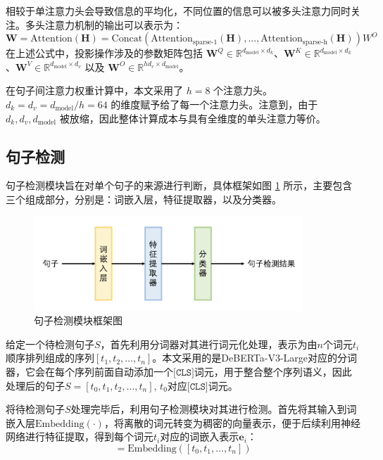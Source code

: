相较于单注意力头会导致信息的平均化，不同位置的信息可以被多头注意力同时关注。多头注意力机制的输出可以表示为：
\begin{equation}
\textbf{W} = \text{Attention}(\textbf{H}) = \text{Concat} \left(\text{Attention}_\text{sparse-1}(\textbf{H}), ..., \text{Attention}_\text{sparse-h}(\textbf{H}) \right)W^O
\label{eq3.2}
\end{equation}
在上述公式中，投影操作涉及的参数矩阵包括 \(\textbf{W}^Q \in \mathbb{R}^{d_{\text{model}} \times d_k}\)、\(\textbf{W}^K \in \mathbb{R}^{d_{\text{model}} \times d_k}\)、\(\textbf{W}^V \in \mathbb{R}^{d_{\text{model}} \times d_v}\) 以及 \(\textbf{W}^O \in \mathbb{R}^{hd_v \times d_{\text{model}}}\)。

在句子间注意力权重计算中，本文采用了 \(h = 8\) 个注意力头。\(d_k = d_v = d_{\text{model}} / h = 64\) 的维度赋予给了每一个注意力头。注意到，由于 \(d_k, d_v, d_{\text{model}} \) 被放缩，因此整体计算成本与具有全维度的单头注意力等价。

\subsection{句子检测}

句子检测模块旨在对单个句子的来源进行判断，具体框架如图 \ref{fig:sentence-classifier} 所示，主要包含三个组成部分，分别是：词嵌入层，特征提取器，以及分类器。

\begin{figure}[htbp]
    \centering
    \includegraphics[width=0.9\textwidth]{figures/sentence-classifier.png}
    \caption{句子检测模块框架图}
    \label{fig:sentence-classifier}
\end{figure}

给定一个待检测句子$S$，首先利用分词器对其进行词元化处理，表示为由$n$个词元$t_{i}$顺序排列组成的序列$[t_{1}, t_{2}, \ldots, t_{n}]$。本文采用的是DeBERTa-V3-Large对应的分词器，它会在每个序列前面自动添加一个$\texttt{[CLS]}$词元，用于整合整个序列语义，因此处理后的句子$S=[t_{0}, t_{1}, t_{2}, \ldots, t_{n}]$, $t_{0}$对应$\texttt{[CLS]}$词元。

将待检测句子$S$处理完毕后，利用句子检测模块对其进行检测。首先将其输入到词嵌入层$\mathrm{Embedding}(\cdot)$，将离散的词元转变为稠密的向量表示，便于后续利用神经网络进行特征提取，得到每个词元$t_{i}$对应的词嵌入表示$\mathbf{e}_{i}$：
\begin{equation}
    [\mathbf{e}_{0}, \mathbf{e}_{1}, \ldots, \mathbf{e}_{n}]=\mathrm{Embedding}([t_{0}, t_{1}, \ldots, t_{n}])
\end{equation}

